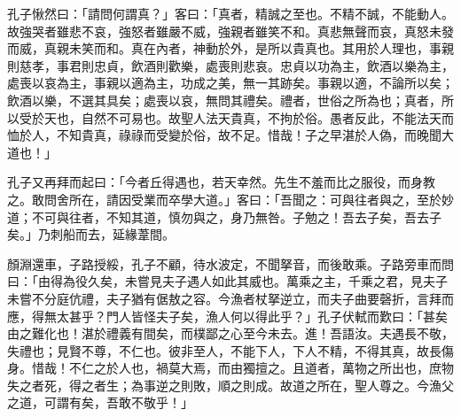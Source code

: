 \begin{pinyinscope}
孔子愀然曰：「請問何謂真？」客曰：「真者，精誠之至也。不精不誠，不能動人。故強哭者雖悲不哀，強怒者雖嚴不威，強親者雖笑不和。真悲無聲而哀，真怒未發而威，真親未笑而和。真在內者，神動於外，是所以貴真也。其用於人理也，事親則慈孝，事君則忠貞，飲酒則歡樂，處喪則悲哀。忠貞以功為主，飲酒以樂為主，處喪以哀為主，事親以適為主，功成之美，無一其跡矣。事親以適，不論所以矣；飲酒以樂，不選其具矣；處喪以哀，無問其禮矣。禮者，世俗之所為也；真者，所以受於天也，自然不可易也。故聖人法天貴真，不拘於俗。愚者反此，不能法天而恤於人，不知貴真，祿祿而受變於俗，故不足。惜哉！子之早湛於人偽，而晚聞大道也！」

孔子又再拜而起曰：「今者丘得遇也，若天幸然。先生不羞而比之服役，而身教之。敢問舍所在，請因受業而卒學大道。」客曰：「吾聞之：可與往者與之，至於妙道；不可與往者，不知其道，慎勿與之，身乃無咎。子勉之！吾去子矣，吾去子矣。」乃刺船而去，延緣葦間。

顏淵還車，子路授綏，孔子不顧，待水波定，不聞拏音，而後敢乘。子路旁車而問曰：「由得為役久矣，未嘗見夫子遇人如此其威也。萬乘之主，千乘之君，見夫子未嘗不分庭伉禮，夫子猶有倨敖之容。今漁者杖拏逆立，而夫子曲要磬折，言拜而應，得無太甚乎？門人皆怪夫子矣，漁人何以得此乎？」孔子伏軾而歎曰：「甚矣由之難化也！湛於禮義有間矣，而樸鄙之心至今未去。進！吾語汝。夫遇長不敬，失禮也；見賢不尊，不仁也。彼非至人，不能下人，下人不精，不得其真，故長傷身。惜哉！不仁之於人也，禍莫大焉，而由獨擅之。且道者，萬物之所出也，庶物失之者死，得之者生；為事逆之則敗，順之則成。故道之所在，聖人尊之。今漁父之道，可謂有矣，吾敢不敬乎！」


\end{pinyinscope}